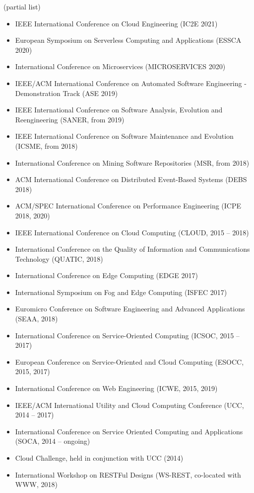 \documentclass[paper=letter,fontsize=11pt]{scrartcl} %
\begin{document}
(partial list)

\begin{itemize}
	\item IEEE International Conference on Cloud Engineering (IC2E 2021)
	\item European Symposium on Serverless Computing and Applications (ESSCA 2020)
	\item International Conference on Microservices (MICROSERVICES 2020)
	\item IEEE/ACM International Conference on Automated Software Engineering - Demonstration Track (ASE 2019)
	\item IEEE International Conference on Software Analysis, Evolution and Reengineering (SANER, from 2019)
	\item IEEE International Conference on Software Maintenance and Evolution (ICSME, from 2018)
	\item International Conference on Mining Software Repositories (MSR, from 2018)
  \item ACM International Conference on Distributed Event-Based Systems (DEBS 2018)
	\item ACM/SPEC International Conference on Performance Engineering (ICPE 2018, 2020)
	\item IEEE International Conference on Cloud Computing (CLOUD, 2015 -- 2018)
	\item International Conference on the Quality of Information and Communications Technology (QUATIC, 2018)
	\item International Conference on Edge Computing (EDGE 2017)
  \item International Symposium on Fog and Edge Computing (ISFEC 2017)
	\item Euromicro Conference on Software Engineering and Advanced Applications (SEAA, 2018)
	\item International Conference on Service-Oriented Computing (ICSOC, 2015 -- 2017)
  \item European Conference on Service-Oriented and Cloud Computing (ESOCC, 2015, 2017)
  \item International Conference on Web Engineering (ICWE, 2015, 2019)
  \item IEEE/ACM International Utility and Cloud Computing Conference (UCC, 2014 -- 2017)
  \item International Conference on Service Oriented Computing and Applications (SOCA, 2014 -- ongoing)
	\item Cloud Challenge, held in conjunction with UCC (2014)
	\item International Workshop on RESTFul Designs (WS-REST, co-located with WWW, 2018)

\end{itemize}
\end{document}
